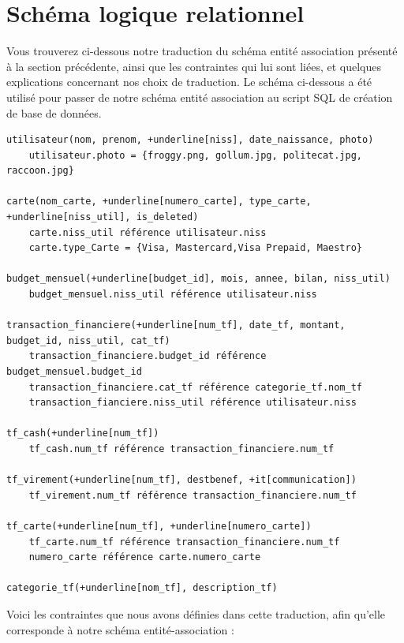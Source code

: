 \documentclass[a4paper,12pt]{article}
\begin{document}
\newpage 

\section{Schéma logique relationnel}

Vous trouverez ci-dessous notre traduction du schéma entité association présenté à la section précédente, ainsi que les contraintes qui lui sont liées, et quelques explications concernant nos choix de traduction.
Le schéma ci-dessous a été utilisé pour passer de notre schéma entité association au script SQL de création de base de données.

\begin{Verbatim}[commandchars=+\[\]]
utilisateur(nom, prenom, +underline[niss], date_naissance, photo)
	utilisateur.photo = {froggy.png, gollum.jpg, politecat.jpg, raccoon.jpg}

carte(nom_carte, +underline[numero_carte], type_carte, +underline[niss_util], is_deleted)
	carte.niss_util référence utilisateur.niss
	carte.type_Carte = {Visa, Mastercard,Visa Prepaid, Maestro}

budget_mensuel(+underline[budget_id], mois, annee, bilan, niss_util) 
	budget_mensuel.niss_util référence utilisateur.niss

transaction_financiere(+underline[num_tf], date_tf, montant, budget_id, niss_util, cat_tf)
	transaction_financiere.budget_id référence budget_mensuel.budget_id
	transaction_financiere.cat_tf référence categorie_tf.nom_tf
	transaction_fianciere.niss_util référence utilisateur.niss

tf_cash(+underline[num_tf])
	tf_cash.num_tf référence transaction_financiere.num_tf

tf_virement(+underline[num_tf], destbenef, +it[communication])
	tf_virement.num_tf référence transaction_financiere.num_tf

tf_carte(+underline[num_tf], +underline[numero_carte])
	tf_carte.num_tf référence transaction_financiere.num_tf	
	numero_carte référence carte.numero_carte

categorie_tf(+underline[nom_tf], description_tf)
\end{Verbatim}

Voici les contraintes que nous avons définies dans cette traduction, afin qu'elle corresponde à notre schéma entité-association :
\end{document}
